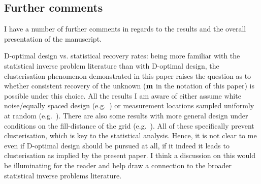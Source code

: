 \subsection{Further comments}
\RC I have a number of further comments in regards to the results and the
overall presentation of the manuscript.


\RC D-optimal design vs. statistical recovery rates: being more
familiar with the statistical inverse problem literature than with
D-optimal design, the clusterisation phenomenon demonstrated in this
paper raises the question as to whether consistent recovery of the
unknown ($\mathbf{m}$ in the notation of this paper) is possible under
this choice. All the results I am aware of either assume white
noise/equally spaced design (e.g.~\cite{knapik2011}) or measurement
locations sampled uniformly at random (e.g.~\cite{nickl2023}). There
are also some results with more general design under conditions on the
fill-distance of the grid (e.g.~\cite{teckentrup2020}). All of these
specifically prevent clusterisation, which is key to the statistical
analysis. Hence, it is not clear to me even if D-optimal design should
be pursued at all, if it indeed it leads to clusterisation as implied
by the present paper. I think a discussion on this would be
illuminating for the reader and help draw a connection to the broader
statistical inverse problems literature.

